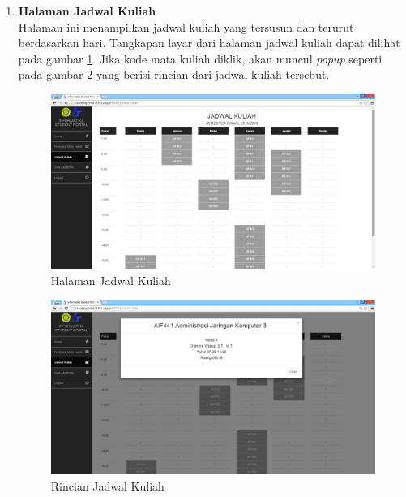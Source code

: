 \begin{enumerate}
				\item\textbf{Halaman Jadwal Kuliah}\\
				Halaman ini menampilkan jadwal kuliah yang tersusun dan terurut berdasarkan hari. Tangkapan layar dari halaman jadwal kuliah dapat dilihat pada gambar \ref{fig:5_hasil_jadwal}. Jika kode mata kuliah diklik, akan muncul \textit{popup} seperti pada gambar \ref{fig:5_hasil_jadwal_rinci} yang berisi rincian dari jadwal kuliah tersebut.
				\begin{figure}[H]
						\centering
						\includegraphics[scale=0.34]{Gambar/hasil_jadwal}
						\caption{Halaman Jadwal Kuliah} 
						\label{fig:5_hasil_jadwal}
					\end{figure}
					
					\begin{figure}[H]
						\centering
						\includegraphics[scale=0.34]{Gambar/hasil_jadwal_popup}
						\caption{Rincian Jadwal Kuliah} 
						\label{fig:5_hasil_jadwal_rinci}
					\end{figure}
					

\end{enumerate}
